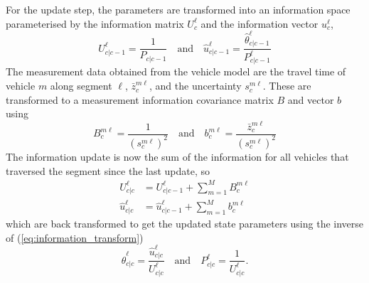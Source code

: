 For the update step, the parameters are transformed into an information
space parameterised by the information matrix $U^\ell_c$
and the information vector $u^\ell_c$,
\begin{equation}
\label{eq:information_transform}
U^\ell_{c|c-1} = \frac{1}{P_{c|c-1}}
\quad\text{and}\quad
\hat u^\ell_{c|c-1} = \frac{\hat \theta^\ell_{c|c-1}}{P^\ell_{c|c-1}}
\end{equation}
The measurement data obtained from the vehicle model are
the travel time of vehicle $m$ along segment $\ell$,
$\bar z_c^{m\ell}$, and the uncertainty $s^{m\ell}_c$.
These are transformed to a measurement information covariance matrix $B$
and vector $b$ using
\begin{equation*}
B^{m\ell}_c = \frac{1}{(s^{m\ell}_c)^{2}}\quad\text{and}\quad
b^{m\ell}_c = \frac{\bar z^{m\ell}_c}{(s^{m\ell}_c)^2}
\end{equation*}
The information update is now the sum of the information for all vehicles
that traversed the segment since the last update, so
\begin{align*}
U^\ell_{c|c} &= U^\ell_{c|c-1} + \sum_{m=1}^M B^{m\ell}_{c} \\
\hat u^\ell_{c|c} &= \hat u^\ell_{c|c-1} + \sum_{m=1}^M b^{m\ell}_{c}
\end{align*}
which are back transformed to get the updated state parameters
using the inverse of (\ref{eq:information_transform})
\begin{equation*}
\hat \theta^\ell_{c|c} = \frac{\hat u^\ell_{c|c}}{U^\ell_{c|c}} 
\quad\text{and}\quad
P^\ell_{c|c} = \frac{1}{U^\ell_{c|c}}.
\end{equation*}



